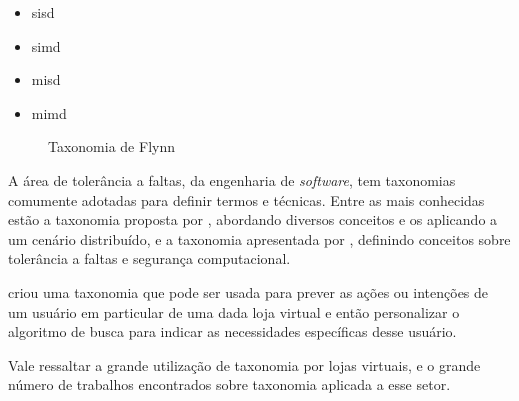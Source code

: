 \begin{minipage}{.66\textwidth}
    \begin{singlespace}
        \begin{itemize}
            \item \acrfull{sisd}
            \item \acrfull{simd}
            \item \acrfull{misd}
            \item \acrfull{mimd}
        \end{itemize}
    \end{singlespace}
\end{minipage}
\vspace{0.5cm}

\begin{figure}[!ht]
    \caption{Taxonomia de Flynn}
    \label{fig:taxonomiaFlynn}  
\end{figure}

\vspace{0.5cm}
\par
A área de tolerância a faltas, da engenharia de \textit{software}, tem taxonomias comumente adotadas para definir termos e técnicas.
Entre as mais conhecidas estão a taxonomia proposta por , abordando diversos conceitos e os aplicando a um cenário distribuído,
e a taxonomia apresentada por , definindo conceitos sobre tolerância a faltas e segurança computacional.

\par
{} criou uma taxonomia que pode ser usada para prever as ações ou intenções de um usuário em particular de uma dada loja virtual
e então personalizar o algoritmo de busca para indicar as necessidades específicas desse usuário.

\par
Vale ressaltar a grande utilização de taxonomia por lojas virtuais, e o grande número de trabalhos encontrados sobre taxonomia aplicada a esse setor.

